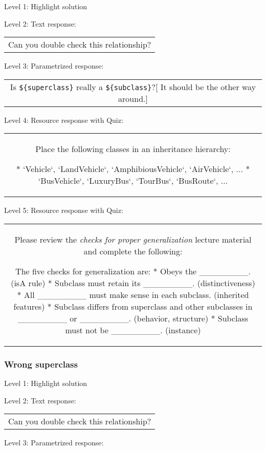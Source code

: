 \noindent Level 1: Highlight solution \medskip

\noindent Level 2: Text response: \medskip

\begin{tabular}{|c}
Can you double check this relationship?
\end{tabular} \medskip

\noindent Level 3: Parametrized response: \medskip

\begin{tabular}{|c}
Is \verb|${superclass}| really a \verb|${subclass}|?[ It should be the other way around.]
\end{tabular} \medskip

\noindent Level 4: Resource response with Quiz:

\begin{tabular}{|c}
Place the following classes in an inheritance hierarchy:

* `Vehicle`, `LandVehicle`, `AmphibiousVehicle`, `AirVehicle`, ...
* `BusVehicle`, `LuxuryBus`, `TourBus`, `BusRoute`, ...
\end{tabular} \medskip

\noindent Level 5: Resource response with Quiz:

\begin{tabular}{|c}
Please review the \textit{checks for proper generalization} lecture material
and complete the following:

The five checks for generalization are:
* Obeys the ________. (isA rule)
* Subclass must retain its ________. (distinctiveness)
* All ________ must make sense in each subclass. (inherited features)
* Subclass differs from superclass and other subclasses in ________ or ________. 
(behavior, structure)
* Subclass must not be ________. (instance)
\end{tabular} \medskip


\subsubsection{Wrong superclass}

\noindent Level 1: Highlight solution \medskip

\noindent Level 2: Text response: \medskip

\begin{tabular}{|c}
Can you double check this relationship?
\end{tabular} \medskip

\noindent Level 3: Parametrized response: \medskip

